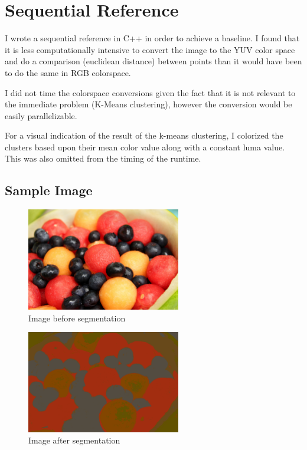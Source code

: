 \documentclass[11pt]{article}
\begin{document}
\section{Sequential Reference}

I wrote a sequential reference in C++ in order to achieve a baseline. I found that
it is less computationally intensive to convert the image to the YUV color space and
do a comparison (euclidean distance) between points than it would have been to do
the same in RGB colorspace.

I did not time the colorspace conversions given the fact that it is not relevant to the
immediate problem (K-Means clustering), however the conversion would be easily
parallelizable.

For a visual indication of the result of the k-means clustering, I colorized the clusters
based upon their mean color value along with a constant luma value. This was also omitted
from the timing of the runtime.

\subsection{Sample Image}

\begin{figure}[ht]
    \centering
    \includegraphics[width=0.6\textwidth]{fruit.png}
    \caption{Image\cite{fruit} before segmentation}
    \label{fig:fruit}
\end{figure}

\begin{figure}[ht]
    \centering
    \includegraphics[width=0.6\textwidth]{fruit-segmented.png}
    \caption{Image after segmentation}
    \label{fig:fruit-segmented}
\end{figure}
\end{document}
